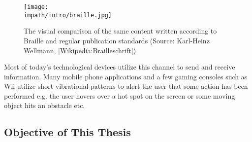 \begin{figure}%
\centering
\texttt{[image: \\impath/intro/braille.jpg]}%
\caption{The visual comparison of the same content written according to Braille and 
regular publication standards (Source: Karl-Heinz Wellmann, \href{http://de.wikipedia.org/wiki/Brailleschrift}{[Wikipedia:Brailleschrift]})}%
\label{fig:braille}%
\end{figure}

Most of today's technological devices utilize this channel to send and receive information. Many mobile phone applications and a few gaming consoles such as Wii\raisebox{0.5ex}{\scriptsize\texttrademark} utilize short vibrational patterns to alert the user that some action has been performed e.g. the user hovers over a hot spot on the screen or some moving object hits an obstacle etc. 





%
%
%
%
%
%
%
%
%



\subsection{Objective of This Thesis}





%
%
%
